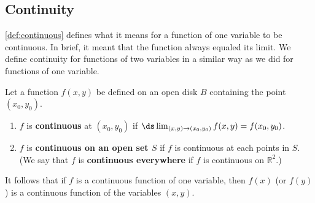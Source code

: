 \subsection{Continuity}

\autoref{def:continuous} defines what it means for a function of one variable to be continuous. In brief, it meant that the function always equaled its limit. We define continuity for functions of two variables in a similar way as we did for functions of one variable.

\begin{definition}[Continuous]\label{def:multi_continuous}
Let a function $f(x,y)$ be defined on an open disk $B$ containing the point $(x_0,y_0)$.
\begin{enumerate}
	\item $f$ is \textbf{continuous} at $(x_0,y_0)$ if $\ds\lim_{(x,y)\to(x_0,y_0)} f(x,y) = f(x_0,y_0)$.
	\item	$f$ is \textbf{continuous on an open set $S$} if $f$ is continuous at each points in $S$. (We say that $f$ is \textbf{continuous everywhere} if $f$ is continuous on $\mathbb{R}^2$.)
\end{enumerate}
\end{definition}

It follows that if $f$ is a continuous function of one variable, then $f(x)$ (or $f(y)$) is a continuous function of the variables $(x,y)$.

